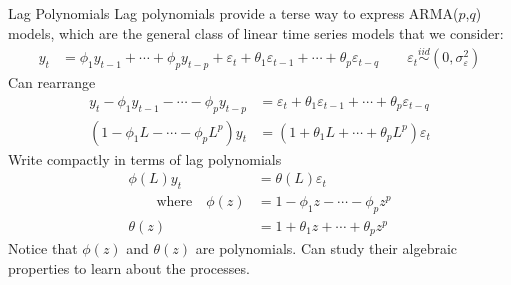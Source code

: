 \documentclass[aspectratio=169, handout]{beamer}
\newcommand{\iid}{\overset{iid}{\sim}}
\begin{document}
{\footnotesize
\begin{frame}{Lag Polynomials}
Lag polynomials provide a terse way to express ARMA($p$,$q$) models,
which are the general class of linear time series models that we
consider:
\begin{align*}
  y_t &=
  \phi_1 y_{t-1} + \cdots + \phi_py_{t-p}
  + \varepsilon_{t}
  + \theta_1\varepsilon_{t-1}
  + \cdots + \theta_p\varepsilon_{t-q}
  \qquad
  \varepsilon_t
  \iid (0,\sigma^2_\varepsilon)
\end{align*}
Can rearrange
\begin{align*}
  y_t - \phi_1 y_{t-1} - \cdots - \phi_py_{t-p}
  &=
  \varepsilon_{t}
  + \theta_1\varepsilon_{t-1}
  + \cdots + \theta_p\varepsilon_{t-q}
  \\
  (1 - \phi_1 L - \cdots - \phi_p L^p)y_t
  &=
  (1 + \theta_1L + \cdots + \theta_p L^p)  \varepsilon_{t}
\end{align*}
Write compactly in terms of lag polynomials
\begin{align*}
  \phi(L)
  y_t
  &=
  \theta(L)
  \varepsilon_{t}
  \\
  \qquad\text{where}\quad
  \phi(z)
  &=
  1 - \phi_1 z - \cdots - \phi_p z^p
  \\
  \theta(z)
  &=
  1 + \theta_1z + \cdots + \theta_p z^p
\end{align*}
Notice that $\phi(z)$ and $\theta(z)$ are \alert{polynomials}.
Can study their algebraic properties to learn about the processes.
\end{frame}
}
\end{document}
